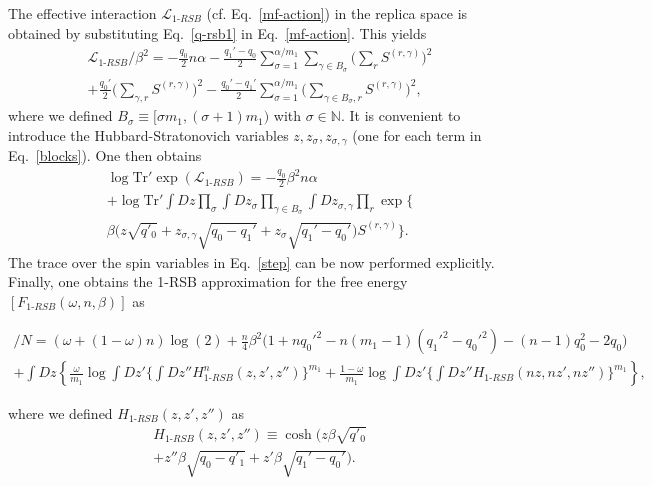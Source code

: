 \documentclass[twocolumn,superscriptaddress,prb,10pt]{revtex4-1}
\def\tr{\textrm{Tr}}
\begin{document}
The effective interaction ${\mathcal L}_{1\textrm{-}RSB}$ (cf. Eq.~\eqref{mf-action}) 
in the replica space is obtained by substituting Eq.~\eqref{q-rsb1} in 
Eq.~\eqref{mf-action}. This yields  
%
\begin{multline}
{\mathcal L}_{1\textrm{-}RSB}/\beta^2=-\frac{q_0}{2}n\alpha
-\frac{q_1'-q_0}{2}\sum\limits_{\sigma=1}^{\alpha/m_1}
\sum\limits_{\gamma\in B_\sigma}\Big(\sum_r S^{(r,\gamma)}\Big)^2\\
+\frac{q_0'}{2}\Big(\sum\limits_{\gamma,r}
S^{(r,\gamma)}\Big)^2-
\frac{q_0'-q_1'}{2}\sum\limits_{\sigma=1}^{\alpha/m_1}
\Big(\sum\limits_{\gamma\in B_\sigma,r}S^{(r,\gamma)}\Big)^2,
\label{blocks}
\end{multline}
%
where we defined $B_\sigma\equiv[\sigma m_1,(\sigma+1)m_1)$ with $\sigma\in\mathbb{N}$. 
It is convenient to introduce the Hubbard-Stratonovich variables $z,z_\sigma,z_{\sigma,\gamma}$ 
(one for each term in Eq.~\eqref{blocks}). One then obtains 
%
\begin{multline}
\label{step}
\log\tr'\exp({\mathcal L}_{1\textrm{-}RSB})=
-\frac{q_0}{2}\beta^2 n\alpha\\
+\log\tr'\int Dz\prod_\sigma\int Dz_\sigma\prod\limits_{\gamma\in B_\sigma}
\int Dz_{\sigma,\gamma}\prod_r\exp\Big\{\\
\beta\Big(z\sqrt{q'_0}+z_{\sigma,\gamma}\sqrt{q_0-q_1'}+
z_{\sigma}\sqrt{q_1'-q_0'}\Big)S^{(r,\gamma)}\Big\}.
\end{multline}
%
The trace over the spin variables in Eq.~\eqref{step} can be now performed explicitly. 
Finally, one obtains the 1-RSB approximation for the free energy 
$[F_{1\textrm{-}RSB}(\omega,n,\beta)]$ as 
%
\begin{widetext}
\begin{multline}
[F_{1\textrm{-}RSB}(\omega,n\beta)]/N=
(\omega+(1-\omega)n)\log(2)+
\frac{n}{4}\beta^2\Big(1+nq_0'^2
-n(m_1-1)(q_1'^2-q_0'^2)-
(n-1)q_0^2-2q_0\Big)\\
+\int Dz\left\{\frac{\omega}{m_1}\log\int Dz'\Big\{\int Dz''
H_{1\textrm{-}RSB}^n(z,z',z'')\Big\}^{m_1}
+\frac{1-\omega}{m_1}
\log\int Dz'\Big\{\int Dz''
H_{1\textrm{-}RSB}(nz,nz',nz'')\Big\}^{m_1}
\right\}, 
\label{RSB-1-logZ}
\end{multline}
\end{widetext}
%
where we defined $H_{1\textrm{-}RSB}(z,z',z'')$ as 
%
\begin{multline}
H_{1\textrm{-}RSB}(z,z',z'')\equiv\cosh(z\beta\sqrt{q'_0}\\+
z''\beta\sqrt{q_0-q'_1} +z'\beta\sqrt{q_1'-q_0'}).
\label{H1}
\end{multline}
\end{document}
